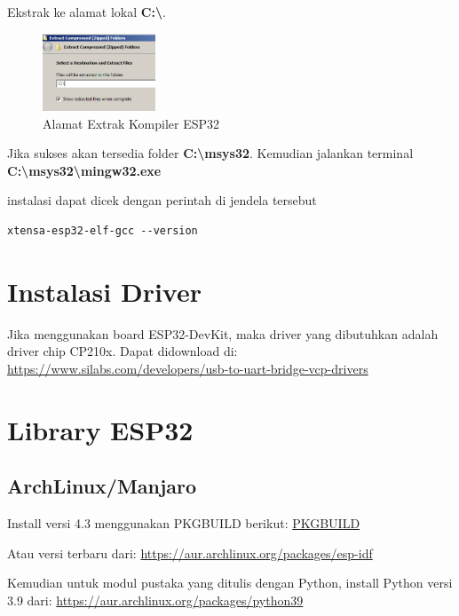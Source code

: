\documentclass[12pt]{book}
\begin{document}
	Ekstrak ke alamat lokal \textbf{C:\textbackslash}.
		
	\begin{figure}[!ht]
		\centering
		\includegraphics[width=0.3\textwidth]{images/esp/esp32win}
		\caption{Alamat Extrak Kompiler ESP32}
	\end{figure}
	
	Jika sukses akan tersedia folder \textbf{C:\textbackslash msys32}.
	Kemudian jalankan terminal \textbf{C:\textbackslash msys32\textbackslash mingw32.exe}
	
	instalasi dapat dicek dengan perintah di jendela tersebut
	\begin{verbatim}
xtensa-esp32-elf-gcc --version
	\end{verbatim}
	
	\section{Instalasi Driver}
	
	Jika menggunakan board ESP32-DevKit, maka driver yang dibutuhkan adalah driver chip CP210x.
	Dapat didownload di: \url{https://www.silabs.com/developers/usb-to-uart-bridge-vcp-drivers}
	
	\section{Library ESP32}
	
	\subsection{ArchLinux/Manjaro}
	
	Install versi 4.3 menggunakan PKGBUILD berikut: \href{https://github.com/mekatronik-achmadi/archlinuxmate/blob/main/pkgbuilds/optional/esp32-idf/PKGBUILD}{PKGBUILD}
	
	Atau versi terbaru dari: \url{https://aur.archlinux.org/packages/esp-idf}
	
	Kemudian untuk modul pustaka yang ditulis dengan Python, install Python versi 3.9 dari: \url{https://aur.archlinux.org/packages/python39}
	
\end{document}
